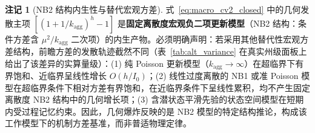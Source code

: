 \documentclass[11pt,a4paper]{article}
\theoremstyle{plain}
\theoremstyle{definition}
\newtheorem*{remark}{注记}
\begin{document}

\begin{remark}[NB2 结构内生性与替代宏观方差]\label{rem:nb2_structure}
式~\eqref{eq:macro_cv2_closed} 中的几何发散主项 $[(1 + 1/k_{\text{agg}})^h - 1]$ 是\textbf{固定离散度宏观负二项更新模型}（NB2 结构：条件方差含 $\mu^2/k_{\text{agg}}$ 二次项）的内生产物。必须明确声明：若采用其他替代性宏观方差结构，前瞻方差的发散轨迹截然不同（表~\ref{tab:alt_variance} 在真实州级面板上给出了该差异的实算量级）：(1) 纯 Poisson 更新模型（$k_{\text{agg}}\to\infty$）在超临界下有界饱和、近临界呈线性增长 $O(h/I_0)$；(2) 线性过度离散的 NB1 或准 Poisson 模型在超临界条件下相对方差有界饱和，在近临界条件下呈线性累积，均不产生固定离散度 NB2 结构中的几何增长项；(3) 含潜状态平滑先验的状态空间模型在短期内受过程记忆约束。因此，几何爆炸反映的是 NB2 模型的特定结构推论，构成该工作模型下的机制方差基准，而非普适物理定律。
\end{remark}
\end{document}
